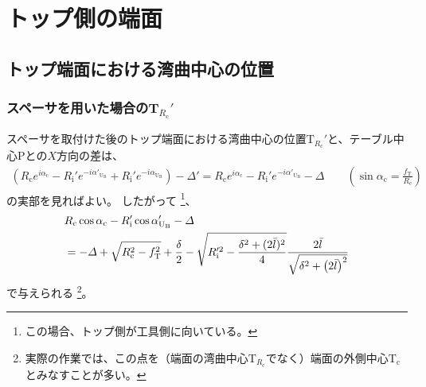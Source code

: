 \section{トップ側の端面}



\subsection{トップ端面における湾曲中心の位置}


\subsubsection{スペーサを用いた場合のT\texorpdfstring{$_{R_\mathrm c}'$}{Rc'}}
スペーサを取付けた後のトップ端面における湾曲中心の位置T$_{R_\mathrm c}'$と、テーブル中心Pとの$X$方向の差は、
\begin{align*}
  \left(
    R_\mathrm ce^{i\alpha_\mathrm c}
    -R_\mathrm i'e^{-i\alpha'_{\mathrm U_\mathrm B}}
    +R_\mathrm i'e^{-i\alpha_{\mathrm U_\mathrm B}}
  \right)
  -\varDelta'
  = R_\mathrm ce^{i\alpha_\mathrm c}-R_\mathrm i'e^{-i\alpha'_{\mathrm U_\mathrm B}}-\varDelta \qquad
    \left(\sin\alpha_\mathrm c = \frac{f_\mathrm T}{R_\mathrm c}\right)
\end{align*}
の実部を見ればよい。
したがって
\footnote{この場合、トップ側が工具側に向いている。}、
\begin{align}
  \notag
  &  R_\mathrm c\cos\alpha_\mathrm c-R_\mathrm i'\cos\alpha'_{\mathrm U_\mathrm B}-\varDelta\\
  &= -\varDelta+\sqrt{R_\mathrm c^2-f_\mathrm T^2}+\frac\delta2
     -\sqrt{R_\mathrm i'^2-\frac{\delta^2+(2\bar l)^2}4}
      \frac{2\bar l}{\sqrt{\delta^2+\left(2\bar l\right)^2}}
     \label{eq:spacerTRc}
\end{align}
で与えられる
\footnote{実際の作業では、この点を（端面の湾曲中心T$_{R_\mathrm c}\!$でなく）端面の外側中心T$_\mathrm c$とみなすことが多い。}。


